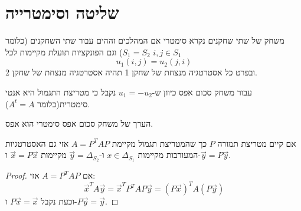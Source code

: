 \documentclass{tstextbook}
\begin{document}
\section{שליטה וסימטרייה}

\begin{definition}
משחק של שתי שחקנים נקרא סימטרי אם המהלכים זההים עבור שתי השחקנים (כלומר \(S_{1}=S_{2}\)) וגם הפונקציות תועלת מקיימות לכל \(i,j \in S_{1}\)$$u_{1}(i,j)=u_{2}(j,i)$$
ובפרט כל אסטרטגיה מנצחת של שחקן 1 תהיה אסטרטגיה מנצחת של שחקן 2.

\end{definition}
\begin{corollary}
עבור משחק סכום אפס כיוון ש-\(u_{1}=-u_{2}\) נקבל כי מטריצת התגמול היא אנטי סימטרית(כלומר \(A^{t}=A\)).

\end{corollary}
\begin{proposition}
הערך של משחק סכום אפס סימטרי הוא אפס.

\end{proposition}
\begin{proposition}
אם קיים מטריצת תמורה \(P\) כך שהמטריצת תגמול מקיימת \(A=P^{T}AP\) אזי גם האסטרטגיות המעורבות מקיימות \(x \in \Delta _{S_{1}}\) ו-\(\vec{y}=\Delta_{S_{2}}\) מקיימות \(\vec{x}=P\vec{x}\) ו-\(\vec{y} = P\vec{y}\).

\end{proposition}
\begin{proof}
אם \(A=P^{T}AP\) אזי:
$$\vec{x}^{T}A\vec{y}=\vec{x}^{T}P^{T}AP\vec{y}=\left( P\vec{x} \right)^{T}A\left( P\vec{y} \right)$$
וכעת נקבל \(P\vec{x}=\vec{x}\) ו-\(P\vec{y} = \vec{y}\).

\end{proof}
\end{document}
